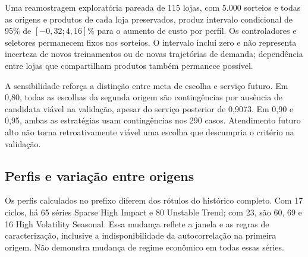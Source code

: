 Uma reamostragem exploratória pareada de 115 lojas, com 5.000 sorteios e todas as origens e produtos de cada loja preservados, produz intervalo condicional de 95\% de $[-0{,}32;4{,}16]\%$ para o aumento de custo por perfil. Os controladores e seletores permanecem fixos nos sorteios. O intervalo inclui zero e não representa incerteza de novos treinamentos ou de novas trajetórias de demanda; dependência entre lojas que compartilham produtos também permanece possível.

A sensibilidade reforça a distinção entre meta de escolha e serviço futuro. Em 0,80, todas as escolhas da segunda origem são contingências por ausência de candidata viável na validação, apesar do serviço posterior de 0,9073. Em 0,90 e 0,95, ambas as estratégias usam contingências nos 290 casos. Atendimento futuro alto não torna retroativamente viável uma escolha que descumpria o critério na validação.

\subsection{Perfis e variação entre origens}

Os perfis calculados no prefixo diferem dos rótulos do histórico completo. Com 17 ciclos, há 65 séries Sparse High Impact e 80 Unstable Trend; com 23, são 60, 69 e 16 High Volatility Seasonal. Essa mudança reflete a janela e as regras de caracterização, inclusive a indisponibilidade da autocorrelação na primeira origem. Não demonstra mudança de regime econômico em todas essas séries.

